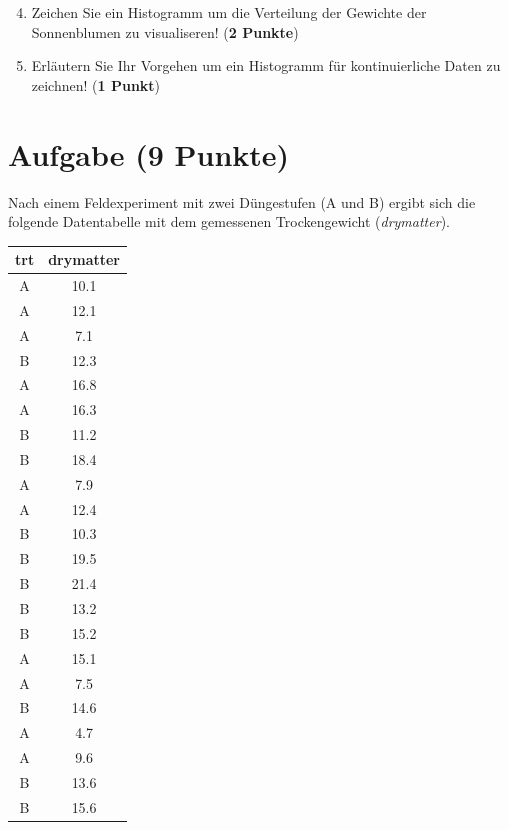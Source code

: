 \documentclass[a4paper, 10pt]{scrartcl}\usepackage[]{graphicx}\usepackage[]{xcolor}
\begin{document}
\begin{enumerate}
  \setcounter{enumi}{3}
\item Zeichen Sie ein Histogramm um die Verteilung der Gewichte der
  Sonnenblumen zu visualiseren! (\textbf{2 Punkte})
\item Erl{\"a}utern Sie Ihr Vorgehen um ein Histogramm f{\"u}r kontinuierliche
  Daten zu zeichnen!  (\textbf{1 Punkt})
 \end{enumerate} 
\clearpage

\section{Aufgabe \hfill (9 Punkte)}

Nach einem Feldexperiment mit zwei D{\"u}ngestufen (A und B) ergibt sich die
folgende Datentabelle mit dem gemessenen Trockengewicht (\textit{drymatter}). 

\begin{table}[!h]
\centering
\begin{tabular}{cc}
\toprule
trt & drymatter\\
\midrule
A & 10.1\\
A & 12.1\\
A & 7.1\\
B & 12.3\\
A & 16.8\\
\addlinespace
A & 16.3\\
B & 11.2\\
B & 18.4\\
A & 7.9\\
A & 12.4\\
\addlinespace
B & 10.3\\
B & 19.5\\
B & 21.4\\
B & 13.2\\
B & 15.2\\
\addlinespace
A & 15.1\\
A & 7.5\\
B & 14.6\\
A & 4.7\\
A & 9.6\\
\addlinespace
B & 13.6\\
B & 15.6\\
\bottomrule
\end{tabular}
\end{table}
\end{document}
